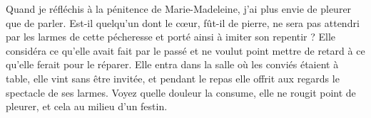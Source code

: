  Quand je réfléchis à la pénitence de Marie-Madeleine, j’ai plus envie de pleurer que de parler. Est-il quelqu’un dont le cœur, fût-il de pierre, ne sera pas attendri par les larmes de cette pécheresse et porté ainsi à imiter son repentir ? Elle considéra ce qu’elle avait fait par le passé et ne voulut point mettre de retard à ce qu’elle ferait pour le réparer. Elle entra dans la salle où les conviés étaient à table, elle vint sans être invitée, et pendant le repas elle offrit aux regards le spectacle de ses larmes. Voyez quelle douleur la consume, elle ne rougit point de pleurer, et cela au milieu d’un festin.